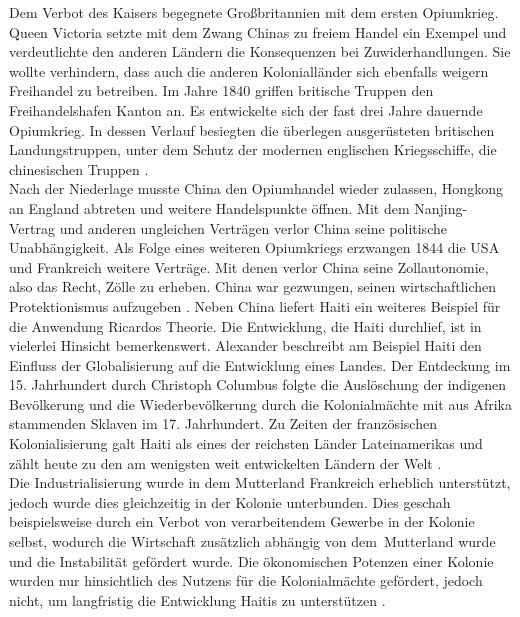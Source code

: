 %
 Dem Verbot des Kaisers begegnete Großbritannien mit dem ersten Opiumkrieg. Queen Victoria setzte mit dem Zwang Chinas zu freiem Handel ein Exempel und verdeutlichte den anderen Ländern die Konsequenzen bei Zuwiderhandlungen. Sie wollte verhindern, dass auch die anderen Kolonialländer sich ebenfalls weigern Freihandel zu betreiben.  Im Jahre 1840 griffen britische Truppen den Freihandelshafen Kanton an. Es entwickelte sich der fast drei Jahre dauernde Opiumkrieg. In dessen Verlauf besiegten die überlegen ausgerüsteten britischen Landungstruppen, unter dem Schutz der modernen englischen Kriegsschiffe, die chinesischen Truppen \cite[S.2]{Straubhaar.2011}.\\
%
 Nach der Niederlage musste China den Opiumhandel wieder zulassen, Hongkong an England abtreten und weitere Handelspunkte öffnen. Mit dem Nanjing-Vertrag und anderen ungleichen Verträgen verlor China seine politische Unabhängigkeit. Als Folge eines weiteren Opiumkriegs erzwangen 1844 die USA und Frankreich weitere Verträge. Mit denen verlor China seine Zollautonomie, also das Recht, Zölle zu erheben. China war gezwungen, seinen wirtschaftlichen Protektionismus aufzugeben \cite[S.5]{Schliemann.1984}.
Neben China liefert Haiti ein weiteres Beispiel für die Anwendung Ricardos Theorie. Die Entwicklung, die Haiti durchlief, ist in vielerlei Hinsicht bemerkenswert. Alexander \cite{King.2005} beschreibt am Beispiel Haiti den Einfluss der Globalisierung auf die Entwicklung eines Landes. Der Entdeckung im 15. Jahrhundert durch Christoph Columbus folgte die Auslöschung der indigenen Bevölkerung und die Wiederbevölkerung durch die Kolonialmächte mit aus Afrika stammenden Sklaven im 17. Jahrhundert. Zu Zeiten der französischen Kolonialisierung galt Haiti als eines der reichsten Länder Lateinamerikas und zählt heute zu den am wenigsten weit entwickelten Ländern der Welt \cite[S. 44]{Beck.2008,IBP.2013,Stauber.2014}.\\
%
 Die Industrialisierung wurde in dem Mutterland Frankreich erheblich unterstützt, jedoch wurde dies gleichzeitig in der Kolonie unterbunden. Dies geschah beispielsweise durch ein Verbot von verarbeitendem Gewerbe in der Kolonie selbst, wodurch die Wirtschaft zusätzlich abhängig  von dem~Mutterland wurde und die Instabilität gefördert wurde. Die ökonomischen Potenzen einer Kolonie wurden nur hinsichtlich des Nutzens für die Kolonialmächte gefördert, jedoch nicht, um langfristig die Entwicklung Haitis zu unterstützen \cite{King.2005}.\\
%
